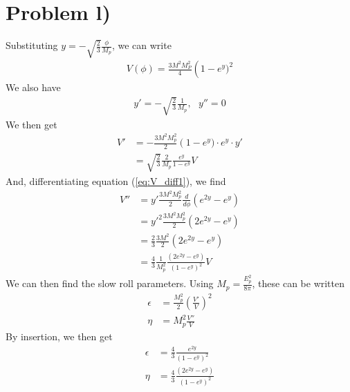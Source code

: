 \documentclass[reprint,english,notitlepage]{revtex4-1}  %
\numberwithin{equation}{section}
\begin{document}
\section{Problem l)}
Substituting $y=-\sqrt{\frac{2}{3}}\frac{\phi}{M_p}$, we can write
\begin{align}
	V(\phi) = \frac{3 M^2 M_P^2}{4} \left(1-e^y)^2
\end{align}
We also have
\begin{align}
	y' = -\sqrt{\frac{2}{3}}\frac{1}{M_p}, \ \ \ y'' = 0
\end{align}
We then get
\begin{align}
	V' &= -\frac{3 M^2 M_p^2}{2}\left(1 - e^y) \cdot e^y \cdot y' \label{eq:V_diff1} \\
		 &= \sqrt{\frac{2}{3}} \frac{2}{M_p} \frac{e^y}{1-e^y} V
\end{align}
And, differentiating equation (\ref{eq:V_diff1}), we find
\begin{align}
	V'' &= y' \frac{3M^2 M_p^2}{2} \frac{d}{d\phi}\left( e^{2y} - e^y \right) \\
			&= y'^2 \frac{3M^2 M_p^2}{2}\left( 2e^{2y}- e^y \right) \\
			&= \frac{2}{3}\frac{3M^2}{2}\left( 2e^{2y} - e^y \right) \\
			&= \frac{4}{3}\frac{1}{M_p^2}\frac{\left(2e^{2y} - e^y\right)}{\left( 1 - e^y\right)^2} V
\end{align}
We can then find the slow roll parameters. Using $M_p = \frac{E_p^2}{8\pi}$,
these can be written
\begin{align}
	\epsilon &= \frac{M_p^2}{2} \left(\frac{V'}{V}\right)^2 \\
  \eta 		 &= M_p^2 \frac{V''}{V}
\end{align}
By insertion, we then get
\begin{align}
	\epsilon &= \frac{4}{3}\frac{e^{2y}}{\left( 1 - e^y \right)^2} \\
  \eta 		 &= \frac{4}{3} \frac{\left(2e^{2y} - e^y\right)}{\left( 1 - e^y\right)^2}
\end{align}
\end{document}
